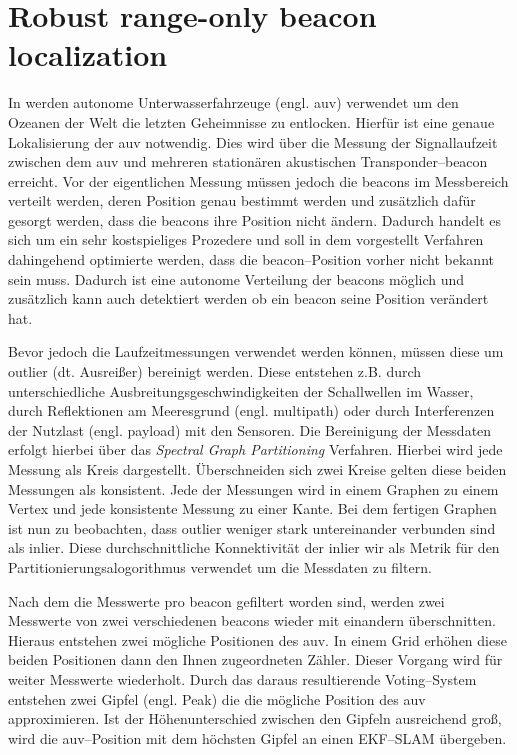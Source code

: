 \section{Robust range-only beacon localization}

In \cite{olson2004robust} werden autonome Unterwasserfahrzeuge (engl. \gls{auv}) verwendet um den Ozeanen der Welt die letzten Geheimnisse zu entlocken. Hierfür ist eine genaue Lokalisierung der \gls{auv} notwendig. Dies wird über die Messung der Signallaufzeit zwischen dem \gls{auv} und mehreren stationären akustischen Transponder--\Gls{beacon} erreicht. Vor der eigentlichen Messung müssen jedoch die \Glspl{beacon} im Messbereich verteilt werden, deren Position genau bestimmt werden und zusätzlich dafür gesorgt werden, dass die \Glspl{beacon} ihre Position nicht ändern. Dadurch handelt es sich um ein sehr kostspieliges Prozedere und soll in dem vorgestellt Verfahren dahingehend optimierte werden, dass die \Gls{beacon}--Position vorher nicht bekannt sein muss. Dadurch ist eine autonome Verteilung der \Glspl{beacon} möglich und zusätzlich kann auch detektiert werden ob ein \Gls{beacon} seine Position verändert hat.

Bevor jedoch die Laufzeitmessungen verwendet werden können, müssen diese um \Gls{outlier} (dt. Ausreißer) bereinigt werden. Diese entstehen z.B. durch unterschiedliche Ausbreitungsgeschwindigkeiten der Schallwellen im Wasser, durch Reflektionen am Meeresgrund (engl. \Gls{multipath}) oder durch Interferenzen der Nutzlast (engl. \Gls{payload}) mit den Sensoren. Die Bereinigung der Messdaten erfolgt hierbei über das \textit{Spectral Graph Partitioning} Verfahren. Hierbei wird jede Messung als Kreis dargestellt. Überschneiden sich zwei Kreise gelten diese beiden Messungen als konsistent. Jede der Messungen wird in einem Graphen zu einem Vertex und jede konsistente Messung zu einer Kante. Bei dem fertigen Graphen ist nun zu beobachten, dass \Gls{outlier} weniger stark untereinander verbunden sind als \Gls{inlier}. Diese durchschnittliche Konnektivität der \Gls{inlier} wir als Metrik für den Partitionierungsalogorithmus verwendet um die Messdaten zu filtern.

Nach dem die Messwerte pro \Gls{beacon} gefiltert worden sind, werden zwei Messwerte von zwei verschiedenen \Glspl{beacon} wieder mit einandern überschnitten. Hieraus entstehen zwei mögliche Positionen des \gls{auv}. In einem Grid erhöhen diese beiden Positionen dann den Ihnen zugeordneten Zähler. Dieser Vorgang wird für weiter Messwerte wiederholt. Durch das daraus resultierende Voting--System entstehen zwei Gipfel (engl. Peak) die die mögliche Position des \gls{auv} approximieren. Ist der Höhenunterschied zwischen den Gipfeln ausreichend groß, wird die \gls{auv}--Position mit dem höchsten Gipfel an einen EKF--SLAM übergeben.



